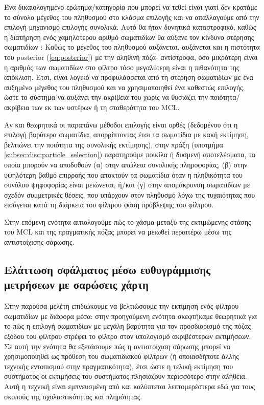 Ένα δικαιολογημένο ερώτημα/κατηγορία που μπορεί να τεθεί είναι γιατί δεν κρατάμε το σύνολο
μέγεθος του πληθυσμού στο κλάσμα επιλογής και να απαλλαγούμε από την επιλογή
μηχανισμό επιλογής συνολικά. Αυτό θα ήταν δυνητικά καταστροφικό, καθώς η διατήρηση ενός χαμηλότερου
αριθμό σωματιδίων θα αύξανε τον κίνδυνο στέρησης σωματιδίων
\cite{bible}: Καθώς το μέγεθος του πληθυσμού αυξάνεται, αυξάνεται και η πιστότητα του
posterior (\ref{eq:posterior}) με την αληθινή πόζα- αντίστροφα, όσο μικρότερη είναι η
αριθμός των σωματιδίων στο φίλτρο τόσο μεγαλύτερη είναι η πιθανότητα της
απόκλιση. Έτσι, είναι λογικό να προφυλάσσεται από τη στέρηση σωματιδίων με ένα
αυξημένο μέγεθος του πληθυσμού και να χρησιμοποιηθεί ένα καθεστώς επιλογής, ώστε το σύστημα
να αυξάνει την ακρίβειά του χωρίς να θυσιάζει την ποιότητα/ακρίβεια των εκ των υστέρων
ή τη σταθερότητα του MCL.

Αν και θεωρητικά οι παραπάνω μέθοδοι επιλογής είναι ορθές (δεδομένου ότι η επιλογή
βαρύτερα σωματίδια, απορρίπτοντας έτσι τα σωματίδια με κακή εκτίμηση, βελτιώνει την
ποιότητα της συνολικής εκτίμησης), στην πράξη (υποτμήμα
\ref{subsec:disc:particle_selection}) παρατηρούμε ποικίλα ή δυσμενή αποτελέσματα,
τα οποία μπορούν να αποδοθούν (α) στην απώλεια συνολικής πληροφορίας, (β) στην υψηλότερη
βαθμό επιρροής που αποκτούν τα σωματίδια όταν η πληθικότητα του συνόλου ψηφοφορίας είναι
μειώνεται, ή/και (γ) στην απομάκρυνση σωματιδίων με σχεδόν συμμετρικές θέσεις, που υπάρχουν
στον πληθυσμό λόγω της τυχαιότητας που εισάγεται κατά τη διάρκεια του φίλτρου
φάση πρόβλεψης του φίλτρου.

Στην επόμενη ενότητα αιτιολογούμε πώς το χάσμα μεταξύ της εκτιμώμενης στάσης του MCL
και της πραγματικής πόζας μπορεί να μειωθεί περαιτέρω μέσω της αντιστοίχισης σάρωσης.

\subsection{Ελάττωση σφάλματος μέσω ευθυγράμμισης μετρήσεων με σαρώσεις χάρτη}


Στην παρούσα μελέτη επιδιώκουμε να βελτιώσουμε την εκτίμηση ενός φίλτρου σωματιδίων με
διάφορα μέσα: στην προηγούμενη ενότητα σκεφτήκαμε θεωρητικά για το πώς
η επιλογή σωματιδίων με μεγάλη βαρύτητα για τον προσδιορισμό της πόζας εξόδου του φίλτρου
στρέφει το φίλτρο στον υπολογισμό ακριβέστερων εκτιμήσεων. Σε αυτή την ενότητα
θα εξετάσουμε πώς η αντιστοίχιση σάρωσης μπορεί να χρησιμοποιηθεί ως πρόθεση του σωματιδιακού
φίλτρων (ή οποιασδήποτε άλλης τεχνικής εντοπισμού στην πραγματικότητα), έτσι ώστε η τελική εκτίμηση του συστήματος
οι εκτιμήσεις του συστήματος πλησιάζουν περισσότερο στην αλήθεια. Αυτή η τεχνική είναι εμπνευσμένη από
\cite{paid_original} και καλύπτεται λεπτομερέστερα εδώ για τους σκοπούς της
σχολαστικότητας και πληρότητας.

